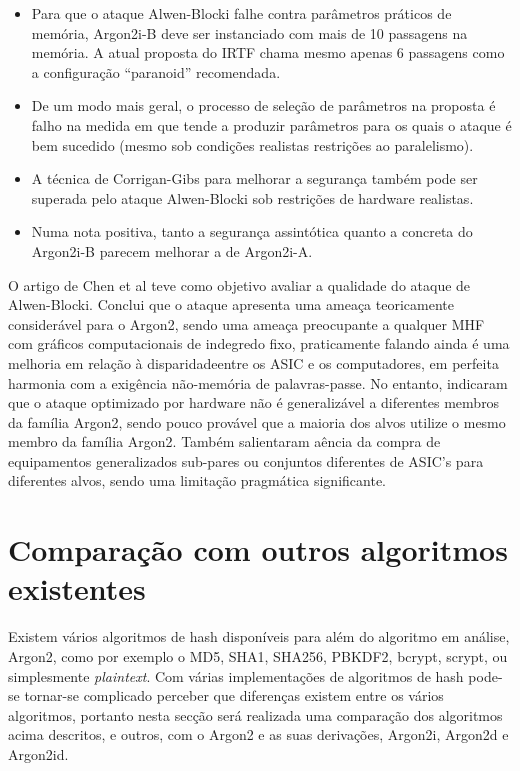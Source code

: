 \documentclass[conference]{IEEEtran}
\begin{document}
\begin{itemize}
\item Para que o ataque Alwen-Blocki falhe contra parâmetros práticos de memória, Argon2i-B
deve ser instanciado com mais de 10 passagens na memória. A atual proposta do IRTF chama
mesmo apenas 6 passagens como a configuração ``paranoid'' recomendada.
\item De um modo mais geral, o processo de seleção de parâmetros na proposta é falho na medida em que
tende a produzir parâmetros para os quais o ataque é bem sucedido (mesmo sob condições realistas
restrições ao paralelismo).
\item A técnica de Corrigan-Gibs para melhorar a segurança também pode ser superada
pelo ataque Alwen-Blocki sob restrições de hardware realistas.
\item Numa nota positiva, tanto a segurança assintótica quanto a concreta do Argon2i-B parecem melhorar 
a de Argon2i-A.
\end{itemize}

O artigo de Chen et al \cite{chen2017investigation} teve como objetivo avaliar a qualidade do 
ataque de Alwen-Blocki. Conclui que o ataque apresenta uma ameaça teoricamente considerável 
para o Argon2, sendo uma ameaça preocupante a qualquer MHF com gráficos computacionais 
de indegredo fixo, praticamente falando ainda é uma melhoria em relação à disparidadeentre 
os ASIC e os computadores, em perfeita harmonia com a exigência não-memória de palavras-passe. 
No entanto, indicaram que o ataque optimizado por hardware não é generalizável a diferentes 
membros da família Argon2, sendo pouco provável que a maioria dos alvos utilize o mesmo 
membro da família Argon2. Também salientaram aência da compra de equipamentos generalizados 
sub-pares ou conjuntos diferentes de ASIC's para diferentes alvos, sendo uma limitação 
pragmática significante.

\section{Comparação com outros algoritmos existentes}

Existem vários algoritmos de hash disponíveis para além do algoritmo em análise, Argon2, como por 
exemplo o MD5, SHA1, SHA256, PBKDF2, bcrypt, scrypt, ou simplesmente \textit{plaintext}. Com várias 
implementações de algoritmos de hash pode-se tornar-se complicado perceber que 
diferenças existem entre os vários algoritmos, portanto nesta secção 
será realizada uma comparação dos algoritmos acima descritos, e outros, 
com o Argon2 e as suas derivações, Argon2i, Argon2d e Argon2id. 
\end{document}
